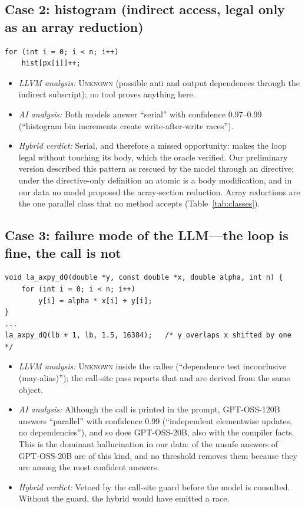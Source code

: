 \subsection{Case 2: histogram (indirect access, legal only as an array reduction)}
\label{sec:case-hist}
\begin{lstlisting}[style=customc, caption={Grey-level histogram (\Code{im\_histogram}).}]
for (int i = 0; i < n; i++)
    hist[px[i]]++;
\end{lstlisting}
\begin{itemize}
    \item \textit{LLVM analysis:} \textsc{Unknown} (possible anti and output dependences through the indirect subscript); no tool proves anything here.
    \item \textit{AI analysis:} Both models answer ``serial'' with confidence 0.97--0.99 (``histogram bin increments create write-after-write races'').
    \item \textit{Hybrid verdict:} Serial, and therefore a missed opportunity:  makes the loop legal without touching its body, which the oracle verified. Our preliminary version described this pattern as rescued by the model through an  directive; under the directive-only definition an atomic is a body modification, and in our data no model proposed the array-section reduction. Array reductions are the one parallel class that no method accepts (Table~\ref{tab:classes}).
\end{itemize}

\subsection{Case 3: failure mode of the LLM---the loop is fine, the call is not}
\begin{lstlisting}[style=customc, caption={An axpy kernel and the call that makes it serial (\Code{la\_axpy}, variant Q).}]
void la_axpy_dQ(double *y, const double *x, double alpha, int n) {
    for (int i = 0; i < n; i++)
        y[i] = alpha * x[i] + y[i];
}
...
la_axpy_dQ(lb + 1, lb, 1.5, 16384);   /* y overlaps x shifted by one */
\end{lstlisting}
\begin{itemize}
    \item \textit{LLVM analysis:} \textsc{Unknown} inside the callee (``dependence test inconclusive (may-alias)''); the call-site pass reports that  and  are derived from the same object.
    \item \textit{AI analysis:} Although the call is printed in the prompt, GPT-OSS-120B answers ``parallel'' with confidence 0.99 (``independent elementwise updates, no dependencies''), and so does GPT-OSS-20B, also with the compiler facts. This is the dominant hallucination in our data: \nAIFPQ{} of the \evAITwentyFP{} unsafe answers of GPT-OSS-20B are of this kind, and no threshold removes them because they are among the most confident answers.
    \item \textit{Hybrid verdict:} Vetoed by the call-site guard before the model is consulted. Without the guard, the hybrid would have emitted a race.
\end{itemize}

